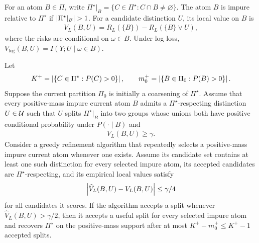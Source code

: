 \begin{definition}
\label{def:impure-atom-local-value}
For an atom $B\in\Pi$, write $\Pi^\star|_B=\{C\in\Pi^\star:C\cap B\ne\varnothing\}$. The atom $B$ is impure relative to $\Pi^\star$ if $\left\lvert\Pi^\star|_B\right\rvert>1$. For a candidate distinction $U$, its local value on $B$ is
\begin{align*}
V_L(B,U)
=
R_L(\{B\})-
R_L\left(\{B\}\vee U\right),
\end{align*}
where the risks are conditional on $\omega\in B$. Under log loss, $V_{\log}(B,U)=I(Y;U\mid \omega\in B)$.
\end{definition}

\begin{theorem}
\label{thm:greedy-recovery:informal}
Let
\begin{align*}
K^+=\left\lvert\{C\in\Pi^\star:P(C)>0\}\right\rvert,
\qquad
m_0^+=\left\lvert\{B\in\Pi_0:P(B)>0\}\right\rvert.
\end{align*}
Suppose the current partition $\Pi_0$ is initially a coarsening of $\Pi^\star$. Assume that every positive-mass impure current atom $B$ admits a $\Pi^\star$-respecting distinction $U\in\mathcal{U}$ such that $U$ splits $\Pi^\star|_B$ into two groups whose unions both have positive conditional probability under $P(\cdot\mid B)$ and
\begin{align*}
V_L(B,U)\ge\gamma.
\end{align*}
Consider a greedy refinement algorithm that repeatedly selects a positive-mass impure current atom whenever one exists. Assume its candidate set contains at least one such distinction for every selected impure atom, its accepted candidates are $\Pi^\star$-respecting, and its empirical local values satisfy
\begin{align*}
\left\lvert\widehat V_L(B,U)-V_L(B,U)\right\rvert\le \gamma/4
\end{align*}
for all candidates it scores. If the algorithm accepts a split whenever $\widehat V_L(B,U)>\gamma/2$, then it accepts a useful split for every selected impure atom and recovers $\Pi^\star$ on the positive-mass support after at most $K^+-m_0^+\le K^+-1$ accepted splits.
\end{theorem}

